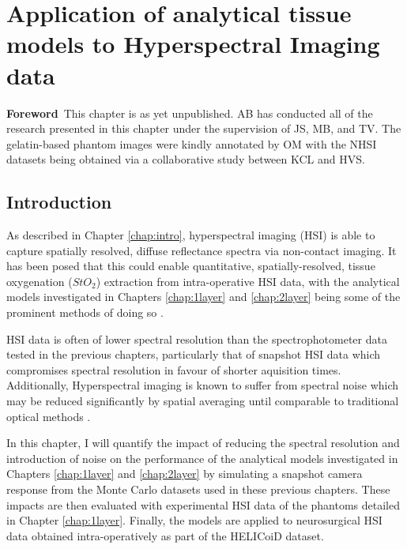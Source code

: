 \chapter[Application of models to HSI data]{Application of analytical tissue models to Hyperspectral Imaging data}\label{chap:HSImodel}
\begin{center}
\begin{minipage}[b]{0.9\linewidth}
\small
\textbf{Foreword\,}
This chapter is as yet unpublished. 
\newline
AB has conducted all of the research presented in this chapter under the supervision of JS, MB, and TV. The gelatin-based phantom images were kindly annotated by OM with the NHSI datasets being obtained via a collaborative study between KCL and HVS. 
\end{minipage}
\end{center}

\minitoc

\section{Introduction}
As described in Chapter \ref{chap:intro}, hyperspectral imaging (HSI) is able to capture spatially resolved, diffuse reflectance spectra via non-contact imaging\cite{Lu2014,Giannoni2018,Calin2014,Shapey2019}. It has been posed that this could enable quantitative, spatially-resolved, tissue oxygenation ($StO_2$) extraction from intra-operative HSI data, with the analytical models investigated in Chapters \ref{chap:1layer} and \ref{chap:2layer} being some of the prominent methods of doing so \cite{Yudovsky2009, Jacques1999, Clancy2015, Clancy2020}. 

HSI data is often of lower spectral resolution than the spectrophotometer data tested in the previous chapters, particularly that of snapshot HSI data which compromises spectral resolution in favour of shorter aquisition times\cite{Geelen2014}. Additionally, Hyperspectral imaging is known to suffer from spectral noise which may be reduced significantly by spatial averaging until comparable to traditional optical methods \cite{Zhang2020}.

In this chapter, I will quantify the impact of reducing the spectral resolution and introduction of noise on the performance of the analytical models investigated in Chapters \ref{chap:1layer} and \ref{chap:2layer} by simulating a snapshot camera response from the Monte Carlo datasets used in these previous chapters. These impacts are then evaluated with experimental HSI data of the phantoms detailed in Chapter \ref{chap:1layer}. Finally, the models are applied to neurosurgical HSI data obtained intra-operatively as part of the HELICoiD dataset. %

